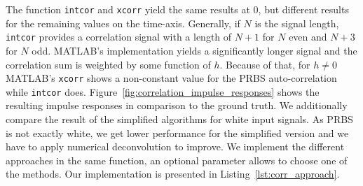 \documentclass{scrartcl}
\begin{document}
The function \texttt{intcor} and \texttt{xcorr} yield the same results at $0$, but different results for the remaining values on the time-axis.
Generally, if $N$ is the signal length, \texttt{intcor} provides a correlation signal with a length of $N+1$ for $N$ even and $N+3$ for $N$ odd.
MATLAB's implementation yields a significantly longer signal and the correlation sum is weighted by some function of $h$.
Because of that, for $h\neq0$ MATLAB's \texttt{xcorr} shows a non-constant value for the PRBS auto-correlation while \texttt{intcor} does.
Figure~\ref{fig:correlation_impulse_responses} shows the resulting impulse responses in comparison to the ground truth.
We additionally compare the result of the simplified algorithms for white input signals.
As PRBS is not exactly white, we get lower performance for the simplified version and we have to apply numerical deconvolution to improve.
We implement the different approaches in the same function, an optional parameter allows to choose one of the methods. 
Our implementation is presented in Listing~\ref{lst:corr_approach}.
\end{document}
